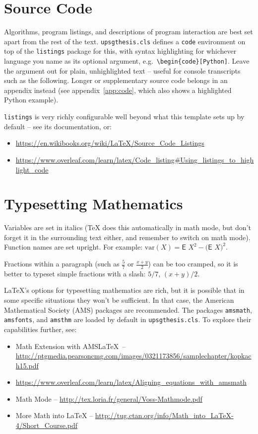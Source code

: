 \section{Source Code}
Algorithms, program listings, and descriptions of program interaction are best set apart from the rest of the text. \texttt{upsgthesis.cls} defines a \texttt{code} environment on top of the \texttt{listings} package for this, with syntax highlighting for whichever language you name as its optional argument, e.g.\ \verb|\begin{code}[Python]|. Leave the argument out for plain, unhighlighted text -- useful for console transcripts such as the following. Longer or supplementary source code belongs in an appendix instead (see appendix~\ref{app:code}, which also shows a highlighted Python example).


\texttt{listings} is very richly configurable well beyond what this template sets up by default -- see its documentation, or:
\begin{itemize}
\item \url{https://en.wikibooks.org/wiki/LaTeX/Source_Code_Listings}
\item \url{https://www.overleaf.com/learn/latex/Code_listing#Using_listings_to_highlight_code}
\end{itemize}


\section{Typesetting Mathematics}
Variables are set in italics (\TeX{} does this automatically in math mode, but don't forget it in the surrounding text either, and remember to switch on math mode). Function names are set upright. For example:
$\textrm{var} (X) = \textsf{E~} X^2 - \bigl(\textsf{E~} X \bigr)^2$.

Fractions within a paragraph (such as $$ or $$) can be too cramped, so it is better to typeset simple fractions with a slash: $5/7$, $(x+y)/2$.

\LaTeX's options for typesetting mathematics are rich, but it is possible that in some specific situations they won't be sufficient. In that case, the American Mathematical Society (AMS) packages are recommended. The packages \texttt{amsmath}, \texttt{amsfonts}, and \texttt{amsthm} are loaded by default in \texttt{upsgthesis.cls}. To explore their capabilities further, see:
\begin{itemize}
\item Math Extension with AMS\LaTeX\ -- \url{http://ptgmedia.pearsoncmg.com/images/0321173856/samplechapter/kopkach15.pdf}
\item \url{https://www.overleaf.com/learn/latex/Aligning_equations_with_amsmath}
\item Math Mode -- \url{http://tex.loria.fr/general/Voss-Mathmode.pdf}
\item More Math into LaTeX -- \url{http://tug.ctan.org/info/Math_into_LaTeX-4/Short_Course.pdf}
\end{itemize}
